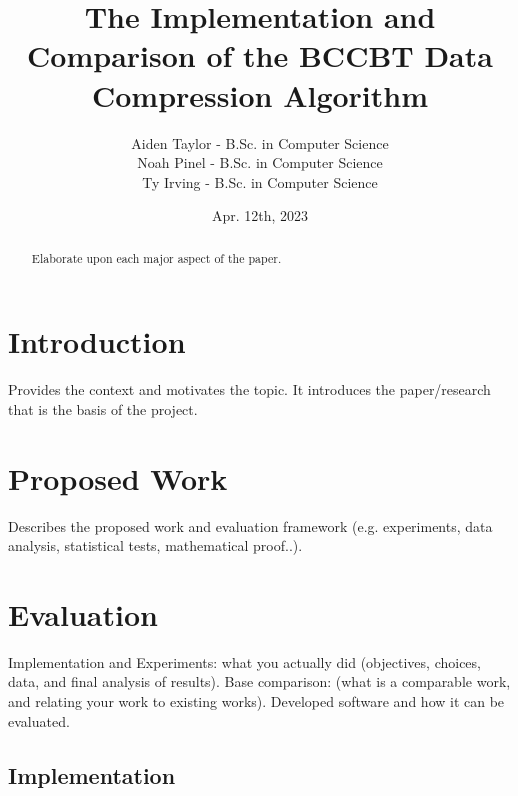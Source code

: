 \documentclass[12pt]{IEEEtran}
\newcommand{\Aiden}{Aiden Taylor - B.Sc. in Computer Science}
\newcommand{\Noah}{Noah Pinel - B.Sc. in Computer Science}
\newcommand{\Ty}{Ty Irving - B.Sc. in Computer Science}
\begin{document}
\title{The Implementation and Comparison of the BCCBT Data Compression Algorithm}
\author{
\begin{tabular}{l}
    \Aiden \\ \Noah\\ \Ty\\ 
\end{tabular}}
\date{Apr. 12th, 2023}

\maketitle

\begin{abstract}
Elaborate upon each major aspect of the paper.
\end{abstract}

\section{Introduction}
Provides the context and motivates the topic. It introduces the paper/research that is the basis of the project. \cite{Sjostrand}


\section{Proposed Work}
Describes the proposed work and evaluation framework (e.g. experiments, data analysis, statistical tests, mathematical proof..).


\section{Evaluation}
Implementation and Experiments: what you actually did (objectives, choices, data, and final analysis of results).
Base comparison: (what is a comparable work, and relating your work to existing works).
Developed software and how it can be evaluated.

\subsection{Implementation}
\end{document}
